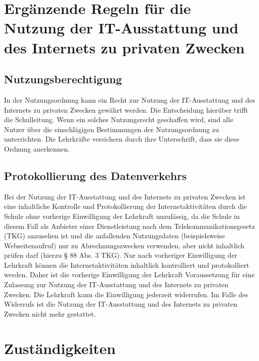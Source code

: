 \documentclass[a4paper, parskip]{scrartcl}
\begin{document}
\section{Ergänzende Regeln für die Nutzung der IT-Ausstattung und des
Internets zu privaten Zwecken}
\subsection{Nutzungsberechtigung}
In der Nutzungsordnung kann ein Recht zur Nutzung der IT-Ausstattung und des
Internets zu privaten Zwecken gewährt werden. Die Entscheidung hierüber trifft
die Schulleitung. Wenn ein solches Nutzungsrecht geschaffen wird, sind alle
Nutzer über die einschlägigen Bestimmungen der Nutzungsordnung zu unterrichten.
Die Lehrkräfte versichern durch ihre Unterschrift, dass sie diese Ordnung anerkennen.
\subsection{Protokollierung des Datenverkehrs}
Bei der Nutzung der IT-Ausstattung und des Internets zu privaten Zwecken ist
eine inhaltliche Kontrolle und Protokollierung der Internetaktivitäten durch
die Schule ohne vorherige Einwilligung der Lehrkraft unzulässig, da die Schule
in diesem Fall als Anbieter einer Dienstleistung nach dem
Telekommunikationsgesetz (TKG) anzusehen ist und die anfallenden Nutzungsdaten
(beispielsweise Webseitenaufruf) nur zu Abrechnungszwecken verwenden, aber
nicht inhaltlich prüfen darf (hierzu § 88 Abs. 3 TKG). Nur nach vorheriger
Einwilligung der Lehrkraft können die Internetaktivitäten inhaltlich
kontrolliert und protokolliert werden. Daher ist die vorherige Einwilligung
der Lehrkraft Voraussetzung für eine Zulassung zur Nutzung der IT-Ausstattung
und des Internets zu privaten Zwecken.
Die Lehrkraft kann die Einwilligung jederzeit widerrufen. Im Falle des
Widerrufs ist die Nutzung der IT-Ausstattung und des Internets zu privaten
Zwecken nicht mehr gestattet.

\section{Zuständigkeiten}
\end{document}
